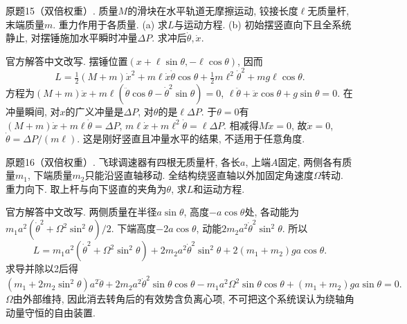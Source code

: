 \begin{exercise}
原题15（双倍权重）. 质量$M$的滑块在水平轨道无摩擦运动, 铰接长度$\ell$无质量杆, 末端质量$m$. 重力作用于各质量. (a) 求$L$与运动方程. (b) 初始摆竖直向下且全系统静止, 对摆锤施加水平瞬时冲量$\Delta P$. 求冲后$\dot\theta,\dot x$.
\end{exercise}
\begin{solution}
官方解答中文改写. 摆锤位置$(x+\ell\sin\theta,-\ell\cos\theta)$, 因而
\[
L=\tfrac12(M+m)\dot x^2+m\ell\dot x\dot\theta\cos\theta
+\tfrac12m\ell^2\dot\theta^2+mg\ell\cos\theta.
\]
方程为$(M+m)\ddot x+m\ell(\ddot\theta\cos\theta-\dot\theta^2\sin\theta)=0$, $\ell\ddot\theta+\ddot x\cos\theta+g\sin\theta=0$. 在冲量瞬间, 对$x$的广义冲量是$\Delta P$, 对$\theta$的是$\ell\Delta P$. 于$\theta=0$有$(M+m)\dot x+m\ell\dot\theta=\Delta P$, $m\ell\dot x+m\ell^2\dot\theta=\ell\Delta P$. 相减得$M\dot x=0$, 故$\dot x=0$, $\dot\theta=\Delta P/(m\ell)$. 这是刚好竖直且冲量水平的结果, 不适用于任意角度.
\end{solution}

\begin{exercise}
原题16（双倍权重）. 飞球调速器有四根无质量杆, 各长$a$, 上端$A$固定, 两侧各有质量$m_1$, 下端质量$m_2$只能沿竖直轴移动. 全结构绕竖直轴以外加固定角速度$\Omega$转动. 重力向下. 取上杆与向下竖直的夹角为$\theta$, 求$L$和运动方程.
\end{exercise}
\begin{center}
\end{center}
\begin{solution}
官方解答中文改写. 两侧质量在半径$a\sin\theta$, 高度$-a\cos\theta$处, 各动能为$m_1a^2(\dot\theta^2+\Omega^2\sin^2\theta)/2$. 下端高度$-2a\cos\theta$, 动能$2m_2a^2\dot\theta^2\sin^2\theta$. 所以
\[
L=m_1a^2(\dot\theta^2+\Omega^2\sin^2\theta)
+2m_2a^2\dot\theta^2\sin^2\theta+2(m_1+m_2)ga\cos\theta.
\]
求导并除以2后得
\[
(m_1+2m_2\sin^2\theta)a^2\ddot\theta
+2m_2a^2\dot\theta^2\sin\theta\cos\theta
-m_1a^2\Omega^2\sin\theta\cos\theta+(m_1+m_2)ga\sin\theta=0.
\]
$\Omega$由外部维持, 因此消去转角后的有效势含负离心项, 不可把这个系统误认为绕轴角动量守恒的自由装置.
\end{solution}

